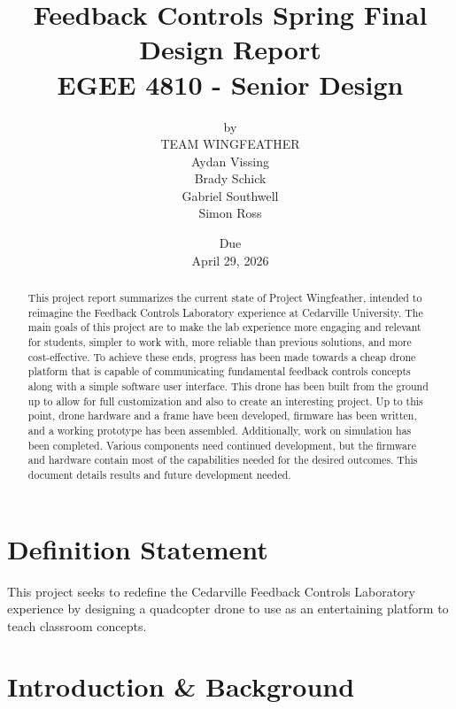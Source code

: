 \documentclass[12pt, titlepage]{article}
\title{\Huge Feedback Controls Spring Final Design Report \\ \normalsize{EGEE 4810 - Senior Design}}
\author{by \\ \Large TEAM WINGFEATHER \\ Aydan Vissing \\ Brady Schick \\ Gabriel Southwell \\ Simon Ross}
\date{\footnotesize{Due} \\ \normalsize{April 29, 2026}}
\begin{document}
\maketitle


\begin{abstract}
This project report summarizes the current state of Project Wingfeather, intended to reimagine the Feedback Controls Laboratory experience at Cedarville University. The main goals of this project are to make the lab experience more engaging and relevant for students, simpler to work with, more reliable than previous solutions, and more cost-effective. To achieve these ends, progress has been made towards a cheap drone platform that is capable of communicating fundamental feedback controls concepts along with a simple software user interface. This drone has been built from the ground up to allow for full customization and also to create an interesting project. Up to this point, drone hardware and a frame have been developed, firmware has been written, and a working prototype has been assembled. Additionally, work on simulation has been completed. Various components need continued development, but the firmware and hardware contain most of the capabilities needed for the desired outcomes. This document details results and future development needed.

\end{abstract}

\newpage
\tableofcontents

\newpage
\section{Definition Statement}

This project seeks to redefine the Cedarville Feedback Controls Laboratory experience by designing a quadcopter drone to use as an entertaining platform to teach classroom concepts. 

\section{Introduction \& Background}
\end{document}
